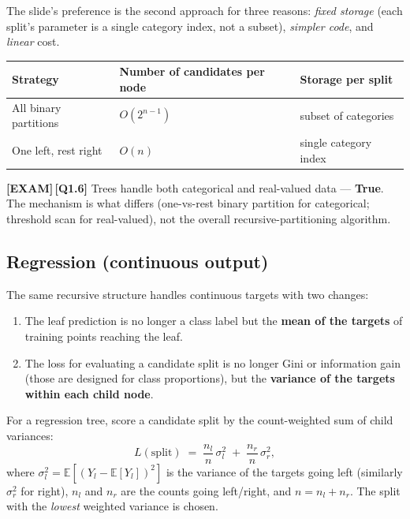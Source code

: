 \documentclass[11pt, a4paper]{article}
\newcommand{\thead}[1]{\textbf{#1}}
\newcommand{\examflag}{\textcolor{tipBd}{\textbf{[EXAM]}}\,}
\begin{document}
The slide's preference is the second approach for three reasons: \emph{fixed storage} (each split's parameter is a single category index, not a subset), \emph{simpler code}, and \emph{linear} cost.

\begin{center}
\renewcommand{\arraystretch}{1.2}
\begin{tabular}{lll}
\toprule
\thead{Strategy} & \thead{Number of candidates per node} & \thead{Storage per split} \\
\midrule
All binary partitions & $O(2^{n-1})$ & subset of categories \\
One left, rest right & $O(n)$ & single category index \\
\bottomrule
\end{tabular}
\end{center}

\examflag{}\textbf{[Q1.6]} Trees handle both categorical and real-valued data — \textbf{True}. The mechanism is what differs (one-vs-rest binary partition for categorical; threshold scan for real-valued), not the overall recursive-partitioning algorithm.

\subsection{Regression (continuous output)}

The same recursive structure handles continuous targets with two changes:

\begin{enumerate}
  \item The leaf prediction is no longer a class label but the \textbf{mean of the targets} of training points reaching the leaf.
  \item The loss for evaluating a candidate split is no longer Gini or information gain (those are designed for class proportions), but the \textbf{variance of the targets within each child node}.
\end{enumerate}

\begin{defbox}
For a regression tree, score a candidate split by the count-weighted sum of child variances:
\[
L(\text{split}) \;=\; \frac{n_l}{n}\,\sigma_l^2 \;+\; \frac{n_r}{n}\,\sigma_r^2,
\]
where $\sigma_l^2 = \mathbb{E}[(Y_l - \mathbb{E}[Y_l])^2]$ is the variance of the targets going left (similarly $\sigma_r^2$ for right), $n_l$ and $n_r$ are the counts going left/right, and $n = n_l + n_r$. The split with the \emph{lowest} weighted variance is chosen.
\end{defbox}
\end{document}
